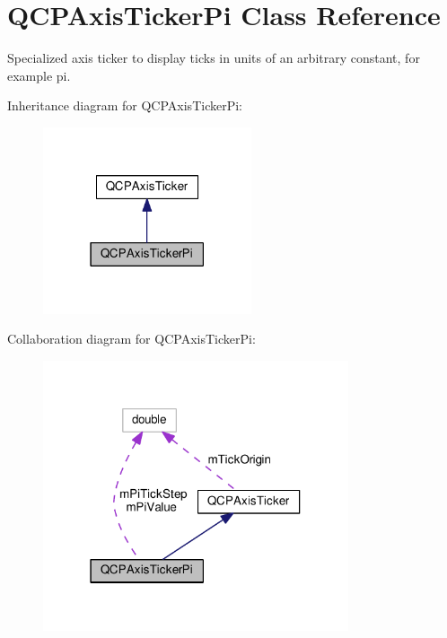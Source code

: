 \hypertarget{classQCPAxisTickerPi}{}\section{Q\+C\+P\+Axis\+Ticker\+Pi Class Reference}
\label{classQCPAxisTickerPi}


Specialized axis ticker to display ticks in units of an arbitrary constant, for example pi.  




Inheritance diagram for Q\+C\+P\+Axis\+Ticker\+Pi\+:
\nopagebreak
\begin{figure}[H]
\begin{center}
\leavevmode
\includegraphics[width=174pt]{classQCPAxisTickerPi__inherit__graph}
\end{center}
\end{figure}


Collaboration diagram for Q\+C\+P\+Axis\+Ticker\+Pi\+:
\nopagebreak
\begin{figure}[H]
\begin{center}
\leavevmode
\includegraphics[width=255pt]{classQCPAxisTickerPi__coll__graph}
\end{center}
\end{figure}
